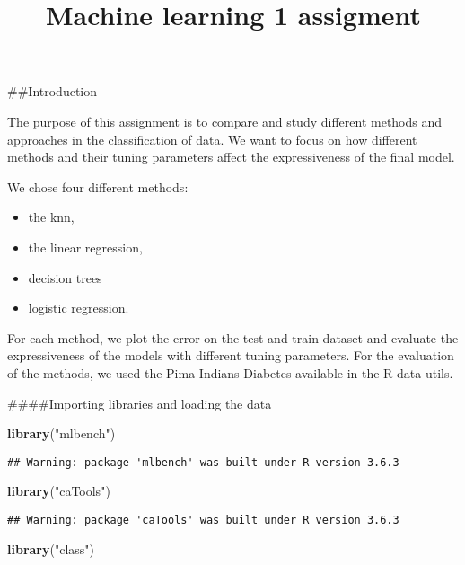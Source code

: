 \documentclass[
]{article}
\title{Machine learning 1 assigment}
\author{}
\date{\vspace{-2.5em}}
\newenvironment{Shaded}{\begin{snugshade}}{\end{snugshade}}
\newcommand{\KeywordTok}[1]{\textcolor[rgb]{0.13,0.29,0.53}{\textbf{#1}}}
\newcommand{\NormalTok}[1]{#1}
\newcommand{\StringTok}[1]{\textcolor[rgb]{0.31,0.60,0.02}{#1}}
\providecommand{\tightlist}{%
  \setlength{\itemsep}{0pt}\setlength{\parskip}{0pt}}
\begin{document}
\maketitle

\#\#Introduction

The purpose of this assignment is to compare and study different methods
and approaches in the classification of data. We want to focus on how
different methods and their tuning parameters affect the expressiveness
of the final model.

We chose four different methods:

\begin{itemize}
\tightlist
\item
  the knn,
\item
  the linear regression,
\item
  decision trees
\item
  logistic regression.
\end{itemize}

For each method, we plot the error on the test and train dataset and
evaluate the expressiveness of the models with different tuning
parameters. For the evaluation of the methods, we used the Pima Indians
Diabetes available in the R data utils.

\#\#\#\#Importing libraries and loading the data

\begin{Shaded}
\begin{Highlighting}[]
\KeywordTok{library}\NormalTok{(}\StringTok{"mlbench"}\NormalTok{)}
\end{Highlighting}
\end{Shaded}

\begin{verbatim}
## Warning: package 'mlbench' was built under R version 3.6.3
\end{verbatim}

\begin{Shaded}
\begin{Highlighting}[]
\KeywordTok{library}\NormalTok{(}\StringTok{"caTools"}\NormalTok{)}
\end{Highlighting}
\end{Shaded}

\begin{verbatim}
## Warning: package 'caTools' was built under R version 3.6.3
\end{verbatim}

\begin{Shaded}
\begin{Highlighting}[]
\KeywordTok{library}\NormalTok{(}\StringTok{"class"}\NormalTok{)}
\end{Highlighting}
\end{Shaded}
\end{document}
